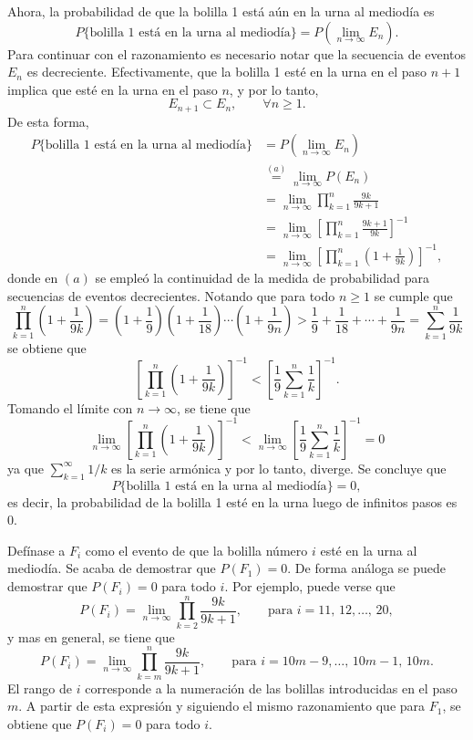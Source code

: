 \documentclass[a4paper]{report}
\begin{document}
Ahora, la probabilidad de que la bolilla 1 está aún en la urna al mediodía es
\[
 P\{\textrm{bolilla 1 está en la urna al mediodía}\}=P\left(\lim_{n\to\infty} E_n\right).
\]
Para continuar con el razonamiento es necesario notar que la secuencia de eventos \(E_n\) es decreciente. Efectivamente, que la bolilla 1 esté en la urna en el paso \(n+1\) implica que esté en la urna en el paso \(n\), y por lo tanto,
\[
 E_{n+1}\subset E_n,\qquad \forall n\geq 1.
\]
De esta forma,
\begin{align*}
 P\{\textrm{bolilla 1 está en la urna al mediodía}\}&=P\left(\lim_{n\to\infty} E_n\right)\\
  &\overset{(a)}{=}\lim_{n\to\infty} P\left(E_n\right)\\
  &=\lim_{n\to\infty}\prod_{k=1}^n\frac{9k}{9k+1}\\
  &=\lim_{n\to\infty}\left[\prod_{k=1}^n\frac{9k+1}{9k}\right]^{-1}\\
  &=\lim_{n\to\infty}\left[\prod_{k=1}^n\left(1+\frac{1}{9k}\right)\right]^{-1},
\end{align*}
donde en \((a)\) se empleó la continuidad de la medida de probabilidad para secuencias de eventos decrecientes. Notando que para todo \(n\geq1\) se cumple que
\[
 \prod_{k=1}^n\left(1+\frac{1}{9k}\right)=\left(1+\frac{1}{9}\right)\left(1+\frac{1}{18}\right)\cdots\left(1+\frac{1}{9n}\right)>\frac{1}{9}+\frac{1}{18}+\cdots+\frac{1}{9n}=\sum_{k=1}^{n}\frac{1}{9k}
\]
se obtiene que
\[
 \left[\prod_{k=1}^n\left(1+\frac{1}{9k}\right)\right]^{-1}<\left[\frac{1}{9}\sum_{k=1}^{n}\frac{1}{k}\right]^{-1}.
\]
Tomando el límite con \(n\to\infty\), se tiene que
\[
 \lim_{n\to\infty}\left[\prod_{k=1}^n\left(1+\frac{1}{9k}\right)\right]^{-1}<\lim_{n\to\infty}\left[\frac{1}{9}\sum_{k=1}^{n}\frac{1}{k}\right]^{-1}=0
\]
ya que \(\sum_{k=1}^{\infty}1/k\) es la serie armónica y por lo tanto, diverge. Se concluye que
\[
 P\{\textrm{bolilla 1 está en la urna al mediodía}\}=0,
\]
es decir, la probabilidad de la bolilla 1 esté en la urna luego de infinitos pasos es 0.

Defínase a \(F_i\) como el evento de que la bolilla número \(i\) esté en la urna al mediodía. Se acaba de demostrar que \(P(F_1)=0\). De forma análoga se puede demostrar que \(P(F_i)=0\) para todo \(i\). Por ejemplo, puede verse que
\[
 P(F_i)=\lim_{n\to\infty}\prod_{k=2}^n\frac{9k}{9k+1},\qquad\textrm{para }i=11,\,12,\dots,\,20,
\]
y mas en general, se tiene que
\[
 P(F_i)=\lim_{n\to\infty}\prod_{k=m}^n\frac{9k}{9k+1},\qquad\textrm{para }i=10m-9,\dots,\,10m-1,\,10m.
\]
El rango de \(i\) corresponde a la numeración de las bolillas introducidas en el paso \(m\). A partir de esta expresión y siguiendo el mismo razonamiento que para \(F_1\), se obtiene que \(P(F_i)=0\) para todo \(i\).
\end{document}
